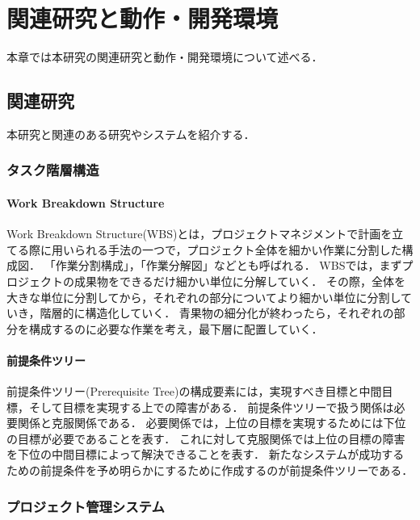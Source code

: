 \chapter{関連研究と動作・開発環境}
本章では本研究の関連研究と動作・開発環境について述べる．

\section{関連研究}
本研究と関連のある研究やシステムを紹介する．

\subsection{タスク階層構造}

\subsubsection{Work Breakdown Structure}
Work Breakdown Structure(WBS)とは，プロジェクトマネジメントで計画を立てる際に用いられる手法の一つで，プロジェクト全体を細かい作業に分割した構成図．
「作業分割構成」，「作業分解図」などとも呼ばれる．
WBSでは，まずプロジェクトの成果物をできるだけ細かい単位に分解していく．
その際，全体を大きな単位に分割してから，それぞれの部分についてより細かい単位に分割していき，階層的に構造化していく．
青果物の細分化が終わったら，それぞれの部分を構成するのに必要な作業を考え，最下層に配置していく．

\subsubsection{前提条件ツリー}
前提条件ツリー(Prerequisite Tree)の構成要素には，実現すべき目標と中間目標，そして目標を実現する上での障害がある．
前提条件ツリーで扱う関係は必要関係と克服関係である．
必要関係では，上位の目標を実現するためには下位の目標が必要であることを表す．
これに対して克服関係では上位の目標の障害を下位の中間目標によって解決できることを表す．
新たなシステムが成功するための前提条件を予め明らかにするために作成するのが前提条件ツリーである．

\subsection{プロジェクト管理システム}


